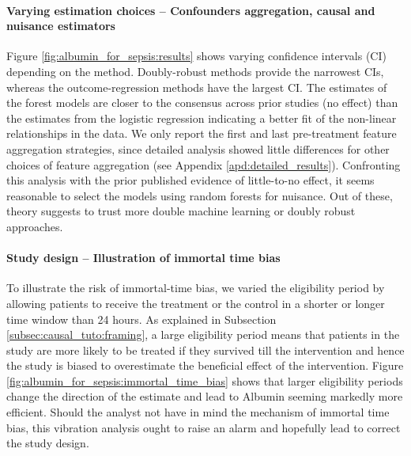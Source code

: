 \documentclass[french,12pt,twoside,a4paper]{book}
\begin{document}
\paragraph{Varying estimation choices -- Confounders aggregation, causal and nuisance estimators}

Figure \ref{fig:albumin_for_sepsis:results} shows varying confidence intervals
(CI) depending on the method. Doubly-robust methods provide the narrowest CIs,
whereas the outcome-regression methods have the largest CI. The estimates of the
forest models are closer to the consensus across prior studies (no effect) than the estimates
from the logistic regression indicating a better fit of the non-linear
relationships in the data.
We only report the first and last
pre-treatment feature aggregation strategies, since detailed analysis showed
little differences for other choices of feature aggregation (see Appendix
\ref{apd:detailed_results}).
%
Confronting this analysis with the prior published evidence of
little-to-no effect, it seems reasonable to select the models using
random forests for nuisance. Out of these, theory suggests to trust more
double machine learning or doubly robust approaches.


\paragraph{Study design -- Illustration of immortal time bias}

To illustrate the risk of immortal-time bias, we varied the eligibility period
by allowing patients to receive the treatment or the control in a shorter or
longer time window than 24 hours. As explained in
Subsection \ref{subsec:causal_tuto:framing}, a large eligibility period
means that patients in the study are more likely to be treated if they survived
till the intervention and hence the study is biased to overestimate the
beneficial effect of the intervention. Figure
\ref{fig:albumin_for_sepsis:immortal_time_bias} shows that larger eligibility
periods change the direction of the estimate and lead to Albumin seeming
markedly more efficient. Should the analyst not have in mind the mechanism of
immortal time bias, this vibration analysis ought to raise an alarm and
hopefully lead to correct the study design.
\end{document}
